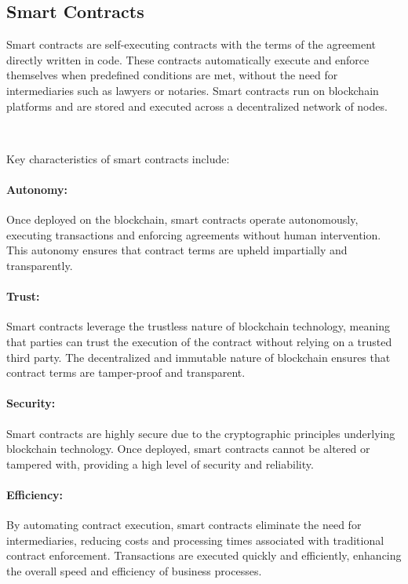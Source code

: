 \subsection{Smart Contracts}
\label{subsec:smart_contracts}

Smart contracts are self-executing contracts with the terms of the agreement directly written in code. These contracts automatically execute and enforce themselves when predefined conditions are met, without the need for intermediaries such as lawyers or notaries. Smart contracts run on blockchain platforms and are stored and executed across a decentralized network of nodes.

~

Key characteristics of smart contracts include:

\paragraph{Autonomy:}
Once deployed on the blockchain, smart contracts operate autonomously, executing transactions and enforcing agreements without human intervention. This autonomy ensures that contract terms are upheld impartially and transparently.

\paragraph{Trust:}
Smart contracts leverage the trustless nature of blockchain technology, meaning that parties can trust the execution of the contract without relying on a trusted third party. The decentralized and immutable nature of blockchain ensures that contract terms are tamper-proof and transparent.

\paragraph{Security:}
Smart contracts are highly secure due to the cryptographic principles underlying blockchain technology. Once deployed, smart contracts cannot be altered or tampered with, providing a high level of security and reliability.

\paragraph{Efficiency:}
By automating contract execution, smart contracts eliminate the need for intermediaries, reducing costs and processing times associated with traditional contract enforcement. Transactions are executed quickly and efficiently, enhancing the overall speed and efficiency of business processes.

